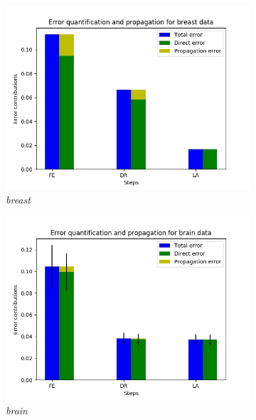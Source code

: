 \begin{figure}[H]
\centering
\begin{subfigure}{.5\textwidth}
  \centering
  \includegraphics[scale=0.4]{img/EP/error_propagation_random_pipeline_breast}
  \caption{\textit{breast}}
  \label{fig:sfig1}
\end{subfigure}%
\begin{subfigure}{.5\textwidth}
  \centering
  \includegraphics[scale=0.4]{img/EP/error_propagation_random_pipeline_brain}
  \caption{\textit{brain}}
  \label{fig:sfig2}
\end{subfigure}
\begin{subfigure}{.5\textwidth}
  \centering

\end{subfigure}
\end{figure}
